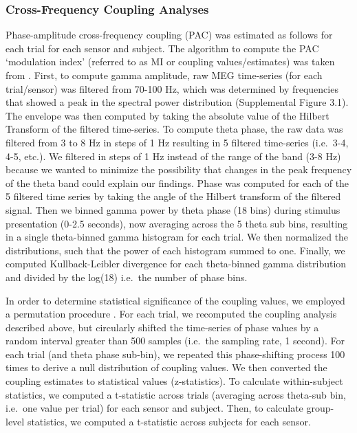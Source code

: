 \subsubsection{Cross-Frequency Coupling
Analyses}\label{cross-frequency-coupling-analyses}

Phase-amplitude cross-frequency coupling (PAC) was estimated as follows
for each trial for each sensor and subject. The algorithm to compute the
PAC `modulation index' (referred to as MI or coupling values/estimates)
was taken from \textcite{tort_measuring_2010}. First, to compute gamma
amplitude, raw MEG time-series (for each trial/sensor) was filtered from
70-100 Hz, which was determined by frequencies that showed a peak in the
spectral power distribution (Supplemental Figure 3.1). The envelope was
then computed by taking the absolute value of the Hilbert Transform of
the filtered time-series. To compute theta phase, the raw data was
filtered from 3 to 8 Hz in steps of 1 Hz resulting in 5 filtered
time-series (i.e.~3-4, 4-5, etc.). We filtered in steps of 1 Hz instead
of the range of the band (3-8 Hz) because we wanted to minimize the
possibility that changes in the peak frequency of the theta band could
explain our findings. Phase was computed for each of the 5 filtered time
series by taking the angle of the Hilbert transform of the filtered
signal. Then we binned gamma power by theta phase (18 bins) during
stimulus presentation (0-2.5 seconds), now averaging across the 5 theta
sub bins, resulting in a single theta-binned gamma histogram for each
trial. We then normalized the distributions, such that the power of each
histogram summed to one. Finally, we computed Kullback-Leibler
divergence for each theta-binned gamma distribution and divided by the
log(18) i.e.~the number of phase bins.

In order to determine statistical significance of the coupling values,
we employed a permutation procedure \autocite{canolty_high_2006}. For
each trial, we recomputed the coupling analysis described above, but
circularly shifted the time-series of phase values by a random interval
greater than 500 samples (i.e.~the sampling rate, 1 second). For each
trial (and theta phase sub-bin), we repeated this phase-shifting process
100 times to derive a null distribution of coupling values. We then
converted the coupling estimates to statistical values (z-statistics).
To calculate within-subject statistics, we computed a t-statistic across
trials (averaging across theta-sub bin, i.e.~one value per trial) for
each sensor and subject. Then, to calculate group-level statistics, we
computed a t-statistic across subjects for each sensor.

